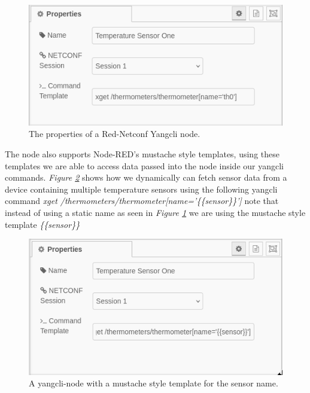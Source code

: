 \documentclass[12pt]{article}
\begin{document}
\begin{figure}
  \centering
  \includegraphics[width=\textwidth]{yangcli-node-settings.png}
  \caption{The properties of a Red-Netconf Yangcli node.}
  \label{fig:yangcli-node}
\end{figure}

\newpage

The node also supports Node-RED's mustache style templates, using these templates we are able to access data passed into the node
inside our yangcli commands. \textit{Figure \ref{fig:yangcli-node-template}} shows how we dynamically can fetch 
sensor data from a device containing multiple temperature sensors using the following 
yangcli command \textit{xget /thermometers/thermometer[name='\{\{sensor\}\}']} note that instead of using a 
static name as seen in \textit{Figure \ref{fig:yangcli-node}} we are using the mustache style template 
\textit{\{\{sensor\}\}}

\begin{figure}
  \centering
  \includegraphics[width=\textwidth]{yangcli-node-settings-wildcard.png}
  \caption{A yangcli-node with a mustache style template for the sensor name.}
  \label{fig:yangcli-node-template}
\end{figure}
\end{document}
